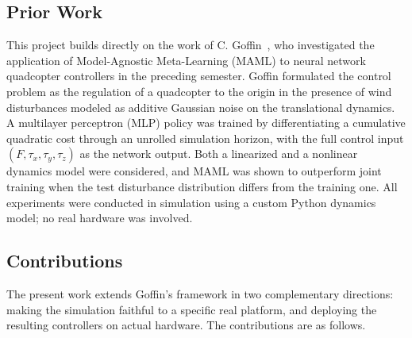 \documentclass[11pt,a4paper]{article}
\theoremstyle{remark}
\numberwithin{equation}{section}
\begin{document}
\subsection{Prior Work}

This project builds directly on the work of C. Goffin~\cite{goffin2026}, who investigated the
application of Model-Agnostic Meta-Learning (MAML) to neural network quadcopter controllers
in the preceding semester. Goffin formulated the control problem as the regulation of a
quadcopter to the origin in the presence of wind disturbances modeled as additive Gaussian
noise on the translational dynamics. A multilayer perceptron (MLP) policy was trained by differentiating a
cumulative quadratic cost through an unrolled simulation horizon, with the full control input
$(F, \tau_x, \tau_y, \tau_z)$ as the network output. Both a linearized and a nonlinear
dynamics model were considered, and MAML was shown to outperform joint training when the
test disturbance distribution differs from the training one. All experiments were conducted
in simulation using a custom Python dynamics model; no real hardware was involved.

\subsection{Contributions}

The present work extends Goffin's framework in two complementary directions: making the
simulation faithful to a specific real platform, and deploying the resulting controllers
on actual hardware. The contributions are as follows.
\end{document}
